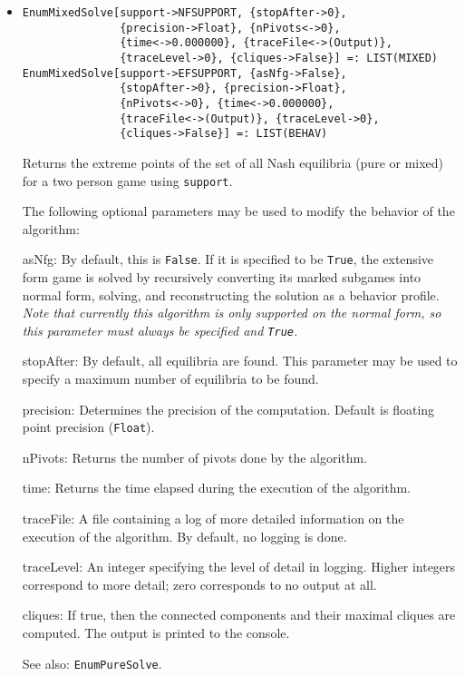 \begin{itemize}
\item{}
\protect \large \begin{verbatim}
EnumMixedSolve[support->NFSUPPORT, {stopAfter->0}, 
               {precision->Float}, {nPivots<->0}, 
               {time<->0.000000}, {traceFile<->(Output)}, 
               {traceLevel->0}, {cliques->False}] =: LIST(MIXED) 
EnumMixedSolve[support->EFSUPPORT, {asNfg->False}, 
               {stopAfter->0}, {precision->Float}, 
               {nPivots<->0}, {time<->0.000000}, 
               {traceFile<->(Output)}, {traceLevel->0},
               {cliques->False}] =: LIST(BEHAV) 
\end{verbatim}\normalsize
\bd
Returns the extreme points of the set of all Nash equilibria (pure or
mixed) for a two person game using \verb+support+.

The following optional parameters may be used to modify the behavior
of the algorithm:
\bd
\item
[asNfg:] By default, this is \verb+False+.  If it is specified to be
\verb+True+, the extensive form game is solved by recursively converting
its marked subgames into normal form, solving, and reconstructing the
solution as a behavior profile.  {\it Note that currently this algorithm
is only supported on the normal form, so this parameter
must always be specified and {\tt True}.} 
\item
[stopAfter:] By default, all equilibria are found.  This parameter may
be used to specify a maximum number of equilibria to be found.
\item
[precision:] Determines the precision of the computation. Default is
floating point precision (\verb+Float+). 
\item
[nPivots:] Returns the number of pivots done by the
algorithm.
\item
[time:] Returns the time elapsed during the execution
of the algorithm.
\item
[traceFile:] A file containing a log of more detailed information on the
execution of the algorithm.  By default, no logging is done.
\item
[traceLevel:] An integer specifying the level of detail in logging.
Higher integers correspond to more detail; zero corresponds to no output
at all.
\item
[cliques:] If true, then the connected components and their maximal
cliques are computed.  The output is printed to the console.
\ed
\item [See also:] \verb+EnumPureSolve+.
\ed


\end{itemize}

